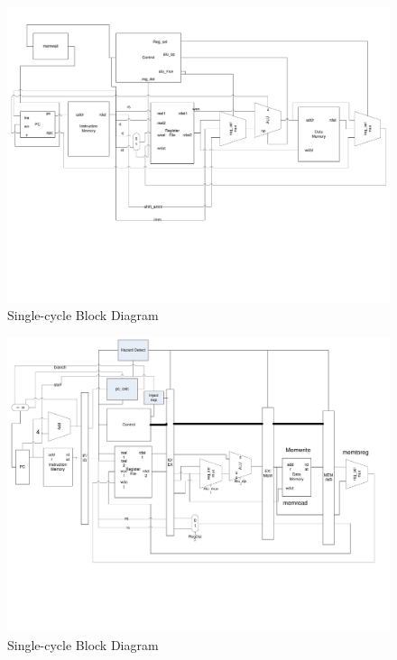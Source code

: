 \documentclass[12pt]{article}
\begin{document}
\newpage

\begin{landscape}

\begin{figure}
	\begin{center}
		\includegraphics[width=7in]{bld}
	\end{center}
	\caption{Single-cycle Block Diagram}
	\label{fig:scbld}
\end{figure}

\end{landscape}

\newpage

\begin{landscape}

\begin{figure}
	\begin{center}
		\includegraphics[width=7in]{bld_pipeline_branch}
	\end{center}
	\caption{Single-cycle Block Diagram}
	\label{fig:scbld}
\end{figure}

\end{landscape}
\end{document}
